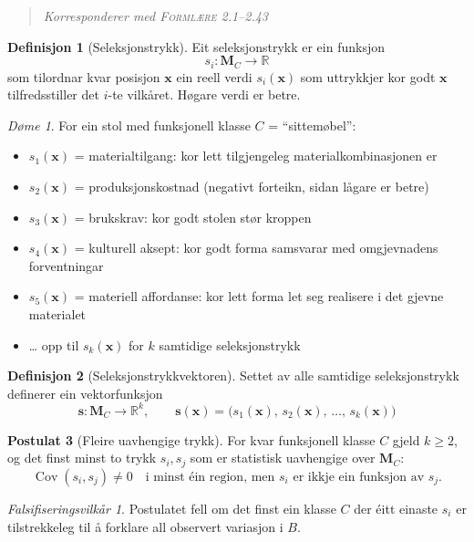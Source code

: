 \documentclass[11pt, a4paper]{article}
\theoremstyle{definition}
\newtheorem{defn}{Definisjon}[section]
\newtheorem{postulat}[defn]{Postulat}
\theoremstyle{plain}
\theoremstyle{remark}
\newtheorem*{doeme}{D\o me}
\newtheorem*{falsifisering}{Falsifiseringsvilk\aa r}
\newcommand{\MC}{\mathbf{M}_C}
\newcommand{\x}{\mathbf{x}}
\newcommand{\svec}{\mathbf{s}}
\newcommand{\Reals}{\mathbb{R}}
\newcommand{\formlaere}{\textsc{Forml\ae re}}
\begin{document}
\begin{quote}
\itshape Korresponderer med \formlaere{} 2.1--2.43
\end{quote}

\begin{defn}[Seleksjonstrykk]
\label{def:seleksjonstrykk}
Eit seleksjonstrykk er ein funksjon
\[
  s_i : \MC \to \Reals
\]
som tilordnar kvar posisjon $\x$ ein reell verdi $s_i(\x)$ som uttrykkjer kor godt $\x$ tilfredsstiller det $i$-te vilk\aa ret. H\o gare verdi er betre.
\end{defn}

\begin{doeme}
For ein stol med funksjonell klasse $C$ = ``sittem\o bel'':
\begin{itemize}
  \item $s_1(\x)$ = materialtilgang: kor lett tilgjengeleg materialkombinasjonen er
  \item $s_2(\x)$ = produksjonskostnad (negativt forteikn, sidan l\aa gare er betre)
  \item $s_3(\x)$ = brukskrav: kor godt stolen st\o r kroppen
  \item $s_4(\x)$ = kulturell aksept: kor godt forma samsvarar med omgjevnadens forventningar
  \item $s_5(\x)$ = materiell affordanse: kor lett forma let seg realisere i det gjevne materialet
  \item[] \ldots{} opp til $s_k(\x)$ for $k$ samtidige seleksjonstrykk
\end{itemize}
\end{doeme}

\begin{defn}[Seleksjonstrykkvektoren]
\label{def:seleksjonsvektor}
Settet av alle samtidige seleksjonstrykk definerer ein vektorfunksjon
\[
  \svec : \MC \to \Reals^k, \qquad
  \svec(\x) = \bigl(s_1(\x),\, s_2(\x),\, \ldots,\, s_k(\x)\bigr)
\]
\end{defn}

\begin{postulat}[Fleire uavhengige trykk]
\label{post:fleiretrykk}
For kvar funksjonell klasse $C$ gjeld $k \ge 2$, og det finst minst to trykk
$s_i, s_j$ som er statistisk uavhengige over $\MC$:
\[
  \operatorname{Cov}(s_i, s_j) \neq 0
  \quad\text{i minst \'ein region, men } s_i \text{ er ikkje ein funksjon av } s_j.
\]
\end{postulat}

\begin{falsifisering}
Postulatet fell om det finst ein klasse $C$ der \'eitt einaste $s_i$ er tilstrekkeleg til \aa{} forklare all observert variasjon i $B$.
\end{falsifisering}
\end{document}
